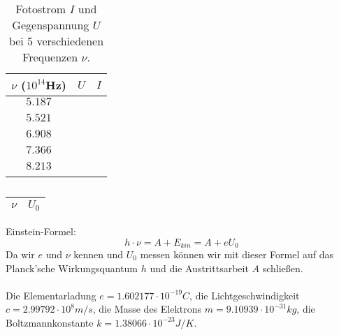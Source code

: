 \documentclass{article}
\begin{document}
\begin{table}[H]
\begin{center}
\begin{tabular}{|c||c|c|}
\hline
$\nu$ ($10^{14}$Hz) & $U$ & $I$\\
\hline
$5.187$ & &\\
 & &\\
$5.521$ & &\\
 & &\\
$6.908$ & &\\
 & &\\
$7.366$ & &\\
 & &\\
$8.213$ & &\\
 & &\\
\hline
\end{tabular}
\caption{Fotostrom $I$ und Gegenspannung $U$ bei 5 verschiedenen Frequenzen $\nu$.}
\end{center}
\end{table}



\begin{table}[H]
\begin{center}
\begin{tabular}{|c|c|}
\hline
$\nu$ & $U_0$\\
\hline

\hline
\end{tabular}
\caption{}
\end{center}
\end{table}


Einstein-Formel:
$$h\cdot\nu=A+E_{kin}=A+eU_0$$
Da wir $e$ und $\nu$ kennen und $U_0$ messen können wir mit dieser Formel auf das Planck'sche Wirkungsquantum $h$ und die Austrittsarbeit $A$ schließen.\\
\\
Die Elementarladung $e=1.602177 \cdot 10^{-19}C$, die Lichtgeschwindigkeit $c=2.99792 \cdot 10^8 m/s$, die Masse des Elektrons $m=9.10939 \cdot 10^{-31}kg$, die Boltzmannkonstante $k=1.38066 \cdot 10^{-23}J/K$.
\end{document}
